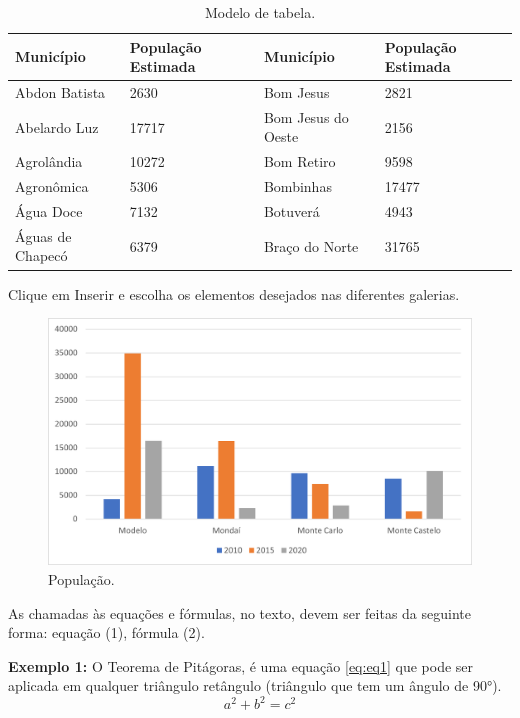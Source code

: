 \begin{table}[!htbp]
	\centering
	\renewcommand{\arraystretch}{1.1}
	\caption{Modelo de tabela.}%
	\label{tab:tabela_exemplo}
	\begin{tabular}{ L{4cm}  R{3cm} || L{4cm}  R{3cm}  }
		\hline
		Município		& População Estimada & Município		& População Estimada 		\\ 
		\hline
		Abdon Batista		& 2630	& Bom Jesus				& 2821 \\ 
		Abelardo Luz		& 17717	& Bom Jesus do Oeste	& 2156 \\ 
		Agrolândia			& 10272	& Bom Retiro			& 9598 \\ 
		Agronômica			& 5306	& Bombinhas				& 17477 \\ 
		Água Doce			& 7132	& Botuverá				& 4943 \\ 
		Águas de Chapecó	& 6379	& Braço do Norte		& 31765 \\ 
		\hline
	\end{tabular}
	\vspace{2mm}
\end{table}

Clique em Inserir e escolha os elementos desejados nas diferentes galerias.

\begin{figure}
	\centering
	\caption{População.}
	\includegraphics[scale=1]{Textuais/Picture2.png}
\end{figure}

As chamadas às equações e fórmulas, no texto, devem ser feitas da seguinte forma: equação (1), fórmula (2).

\textbf{Exemplo 1:}
O Teorema de Pitágoras, é uma equação \eqref{eq:eq1} que pode ser aplicada em qualquer triângulo retângulo (triângulo que tem um ângulo de 90°).
\begin{equation} \label{eq:eq1}
a^2 + b^2 = c^2 
\end{equation}

